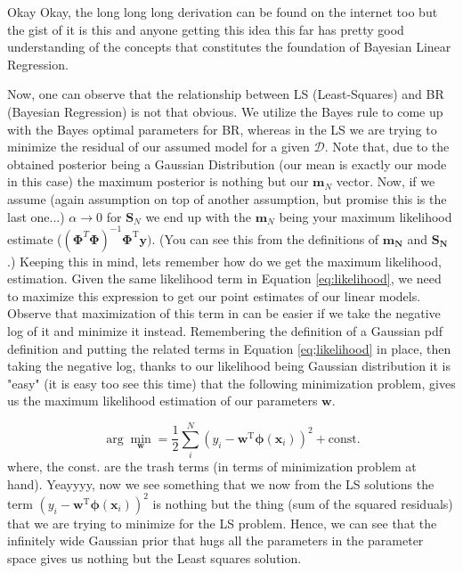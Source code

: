 \documentclass{article}
\begin{document}
Okay Okay, the long long long derivation can be found on the internet too but the gist of it is this and anyone getting this idea this far has pretty good understanding of the concepts that constitutes the foundation of Bayesian Linear Regression. 

Now, one can observe that the relationship between LS (Least-Squares) and BR (Bayesian Regression) is not that obvious. We utilize the Bayes rule to come up with the Bayes optimal parameters for BR, whereas in the LS we are trying to minimize the residual of our assumed model for a given $\mathcal{D}$. Note that, due to the obtained posterior being a Gaussian Distribution (our mean is exactly our mode in this case) the maximum posterior is nothing but our $\mathbf{m}_N$ vector. Now, if we assume (again assumption on top of another assumption, but promise this is the last one...) $\alpha\to 0$ for $\mathbf{S}_N$ we end up with the $\mathbf{m}_N$ being your maximum likelihood estimate ($(\boldsymbol{\Phi}^T\boldsymbol{\Phi})^{-1}\boldsymbol{\Phi}^{\text{T}}\mathbf{y})$. (You can see this from the definitions of $\mathbf{m_N}$ and $\mathbf{S_N}$.) Keeping this in mind, lets remember how do we get the maximum likelihood, estimation. Given the same likelihood term in Equation \ref{eq:likelihood}, we need to maximize this expression to get our point estimates of our linear models. Observe that maximization of this term in can be easier if we take the negative log of it and minimize it instead. Remembering the definition of a Gaussian pdf definition and putting the related terms in Equation \ref{eq;likelihood} in place, then taking the negative log, thanks to our likelihood being Gaussian distribution it is "easy" (it is easy too see this time) that the following minimization problem, gives us the maximum likelihood estimation of our parameters $\mathbf{w}$.

\begin{equation}
  \arg \min_{\mathbf{w}} = \frac{1}{2} \sum_i^N (y_i-\mathbf{w}^\text{T}\boldsymbol{\phi}(\mathbf{x}_i))^2+\text{const.}
\end{equation}
where, the const. are the trash terms (in terms of minimization problem at hand). Yeayyyy, now we see something that we now from the LS solutions the term $(y_i-\mathbf{w}^\text{T}\boldsymbol{\phi}(\mathbf{x}_i))^2$ is nothing but the thing (sum of the squared residuals) that we are trying to minimize for the LS problem. Hence, we can see that the infinitely wide Gaussian prior that hugs all the parameters in the parameter space gives us nothing but the Least squares solution.
\end{document}
